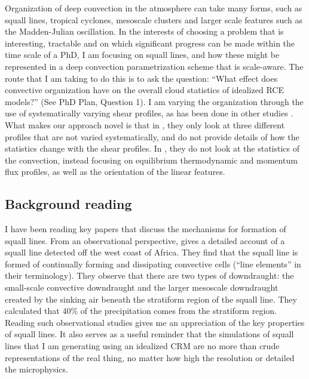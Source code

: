 \documentclass[11pt,a4paper]{article}
\begin{document}
Organization of deep convection in the atmosphere can take many forms, such as squall lines, tropical cyclones, mesoscale clusters and larger scale features such as the Madden-Julian oscillation. In the interests of choosing a problem that is interesting, tractable and on which significant progress can be made within the time scale of a PhD, I am focusing on squall lines, and how these might be represented in a deep convection parametrization scheme that is scale-aware. The route that I am taking to do this is to ask the question: ``What effect does convective organization have on the overall cloud statistics of idealized RCE models?'' (See PhD Plan, Question 1). I am varying the organization through the use of systematically varying shear profiles, as has been done in other studies \parencite{RE2001, cohen2006fluctuations}. What makes our approach novel is that in \cite{cohen2006fluctuations}, they only look at three different profiles that are not varied systematically, and do not provide details of how the statistics change with the shear profiles. In \cite{RE2001}, they do not look at the statistics of the convection, instead focusing on equilibrium thermodynamic and momentum flux profiles, as well as the orientation of the linear features. 

\subsection{Background reading}

I have been reading key papers that discuss the mechanisms for formation of squall lines. From an observational perspective, \cite{houze1977structure} gives a detailed account of a squall line detected off the west coast of Africa. They find that the squall line is formed of continually forming and dissipating convective cells (``line elements'' in their terminology). They observe that there are two types of downdraught: the small-scale convective downdraught and the larger mesoscale downdraught created by the sinking air beneath the stratiform region of the squall line. They calculated that 40\% of the precipitation comes from the stratiform region. Reading such observational studies gives me an appreciation of the key properties of squall lines. It also serves as a useful reminder that the simulations of squall lines that I am generating using an idealized CRM are no more than crude representations of the real thing, no matter how high the resolution or detailed the microphysics.

\end{document}
